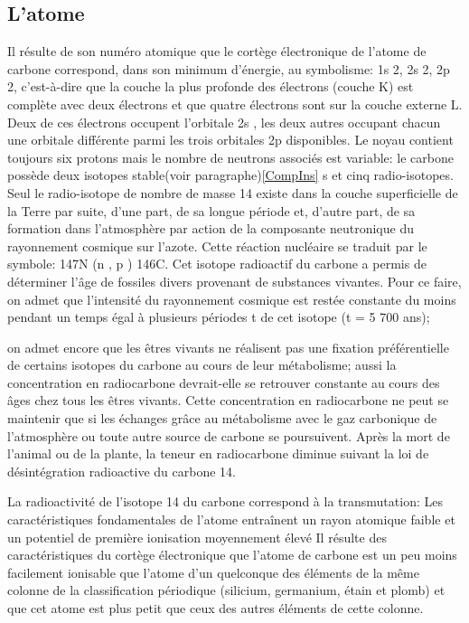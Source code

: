 \documentclass[a4 paper, 10 pt]{article}
\begin{document}
\subsection{L'atome} 
Il résulte de son numéro atomique que le cortège
électronique de l'atome de carbone correspond, dans son minimum
d'énergie, au symbolisme: 1s 2, 2s 2, 2p 2,
c'est-à-dire que la couche la plus profonde des électrons
(couche K) est complète avec deux électrons et que quatre
électrons sont sur la couche externe L. Deux de ces électrons
occupent l'orbitale 2s , les deux autres occupant chacun une
orbitale différente parmi les trois orbitales 2p disponibles. Le
noyau contient toujours six protons mais le nombre de neutrons
associés est variable: 
le carbone possède deux isotopes stable(voir paragraphe)\ref{CompIns} s
et cinq radio-isotopes. Seul le radio-isotope de nombre de masse 14
existe dans la couche superficielle de la Terre par suite, d'une part,
de sa longue période et, d'autre part, de sa formation dans
l'atmosphère par action de la composante neutronique du rayonnement
cosmique sur l'azote. Cette réaction nucléaire se traduit par le
symbole: 147N (n , p ) 146C. Cet isotope radioactif du
carbone a permis de déterminer l'âge de fossiles divers
provenant de substances vivantes. Pour ce faire, on admet que
l'intensité du rayonnement cosmique est restée constante du
moins pendant un temps égal à plusieurs périodes t de cet
isotope (t = 5 700 ans);\newline 


 on admet encore que les êtres vivants ne réalisent pas une fixation préférentielle de certains isotopes du carbone au cours de leur métabolisme; aussi la concentration en radiocarbone devrait-elle se retrouver constante au cours des âges chez tous les êtres vivants. Cette concentration en radiocarbone ne peut se maintenir que si les échanges grâce au métabolisme avec le gaz carbonique de l'atmosphère ou toute autre source de carbone se poursuivent. Après la mort de l'animal ou de la plante, la teneur en radiocarbone diminue suivant la loi de désintégration radioactive du carbone 14.\newline 



 La radioactivité de l'isotope 14 du carbone correspond à la transmutation: Les caractéristiques fondamentales de l'atome entraînent un rayon atomique faible et un potentiel de première ionisation moyennement élevé Il résulte des caractéristiques du cortège électronique que l'atome de carbone est un peu moins facilement ionisable que l'atome d'un quelconque des éléments de la même colonne de la classification périodique (silicium, germanium,
étain et plomb) et que cet atome est plus petit que ceux des autres
éléments de cette colonne. 
\end{document}
